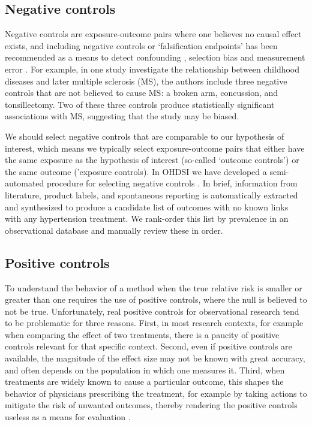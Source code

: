 \documentclass[11pt]{book}
\begin{document}
\subsection{Negative controls}\label{negative-controls}

Negative controls are exposure-outcome pairs where one believes no
causal effect exists, and including negative controls or `falsification
endpoints' \citep{prased_2013} has been recommended as a means to detect
confounding \citep{lipsitch_2010}, selection bias and measurement error
\citep{arnold_2016}. For example, in one study \citep{zaadstra_2008}
investigate the relationship between childhood diseases and later
multiple sclerosis (MS), the authors include three negative controls
that are not believed to cause MS: a broken arm, concussion, and
tonsillectomy. Two of these three controls produce statistically
significant associations with MS, suggesting that the study may be
biased.

We should select negative controls that are comparable to our hypothesis
of interest, which means we typically select exposure-outcome pairs that
either have the same exposure as the hypothesis of interest (so-called
`outcome controls') or the same outcome ('exposure controls). In OHDSI
we have developed a semi-automated procedure for selecting negative
controls \citep{voss_2016}. In brief, information from literature,
product labels, and spontaneous reporting is automatically extracted and
synthesized to produce a candidate list of outcomes with no known links
with any hypertension treatment. We rank-order this list by prevalence
in an observational database and manually review these in order.

\subsection{Positive controls}\label{positive-controls}

To understand the behavior of a method when the true relative risk is
smaller or greater than one requires the use of positive controls, where
the null is believed to not be true. Unfortunately, real positive
controls for observational research tend to be problematic for three
reasons. First, in most research contexts, for example when comparing
the effect of two treatments, there is a paucity of positive controls
relevant for that specific context. Second, even if positive controls
are available, the magnitude of the effect size may not be known with
great accuracy, and often depends on the population in which one
measures it. Third, when treatments are widely known to cause a
particular outcome, this shapes the behavior of physicians prescribing
the treatment, for example by taking actions to mitigate the risk of
unwanted outcomes, thereby rendering the positive controls useless as a
means for evaluation \citep{noren_2014}.
\end{document}
